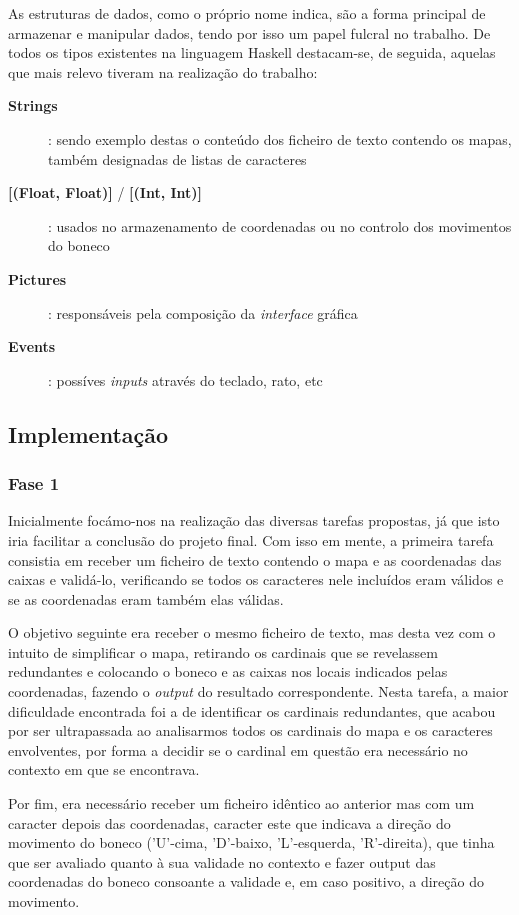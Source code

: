 \documentclass[a4paper]{article}
\begin{document}
As estruturas de dados, como o próprio nome indica, são a forma principal de armazenar e manipular dados, tendo por isso um papel fulcral no trabalho. De todos os tipos existentes na linguagem Haskell destacam-se, de seguida, aquelas que mais relevo tiveram na realização do trabalho:
\begin{description}
		\item [\textbf 	{Strings}] : sendo exemplo destas o conteúdo dos ficheiro de texto contendo os mapas, também designadas de listas de caracteres
		\item [\textbf 	{[(Float, Float)]} / \textbf {[(Int, Int)]}] : usados no armazenamento de coordenadas ou no controlo dos movimentos do boneco
		\item [\textbf 	{Pictures}] : responsáveis pela composição da \textit{interface} gráfica
		\item [\textbf {Events}] : possíves \textit{inputs} através do teclado, rato, etc
\end{description}

	
\subsection{Implementação}


\subsubsection{Fase 1}
Inicialmente focámo-nos na realização das diversas tarefas propostas, já que isto iria facilitar a conclusão do projeto final. Com isso em mente, a primeira tarefa consistia em receber um ficheiro de texto contendo o mapa e as coordenadas das caixas e validá-lo, verificando se todos os caracteres nele incluídos eram válidos e se as coordenadas eram também elas válidas.

O objetivo seguinte era receber o mesmo ficheiro de texto, mas desta vez com o intuito de simplificar o mapa, retirando os cardinais que se revelassem redundantes e colocando o boneco e as caixas nos locais indicados pelas coordenadas, fazendo o \textit{output} do resultado correspondente. Nesta tarefa, a maior dificuldade encontrada foi a de identificar os cardinais redundantes, que acabou por ser ultrapassada ao analisarmos todos os cardinais do mapa e os caracteres envolventes, por forma a decidir se o cardinal em questão era necessário no contexto em que se encontrava.

Por fim, era necessário receber um ficheiro idêntico ao anterior mas com um caracter depois das coordenadas, caracter este que indicava a direção do movimento do boneco ('U'-cima, 'D'-baixo, 'L'-esquerda, 'R'-direita), que tinha que ser avaliado quanto à sua validade no contexto e fazer output das coordenadas do boneco consoante a validade e, em caso positivo, a direção do movimento.
\end{document}
